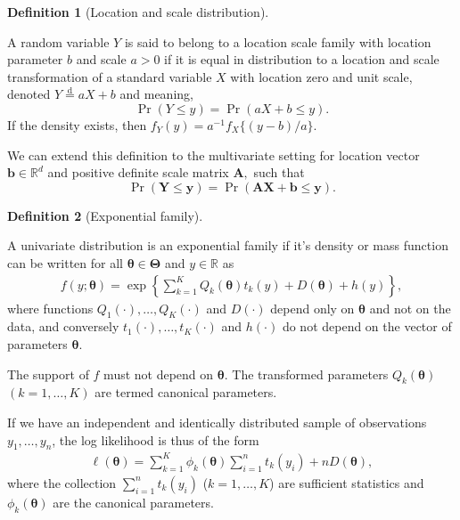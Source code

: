 \documentclass[
  11pt,
  letterpaper,
]{scrbook}
\theoremstyle{definition}
\newtheorem{definition}{Definition}[chapter]
\theoremstyle{plain}
\theoremstyle{plain}
\theoremstyle{definition}
\theoremstyle{definition}
\theoremstyle{remark}
\begin{document}
\begin{definition}[Location and scale
distribution]\protect\hypertarget{def-location-scale}{}\label{def-location-scale}

A random variable \(Y\) is said to belong to a location scale family
with location parameter \(b\) and scale \(a>0\) if it is equal in
distribution to a location and scale transformation of a standard
variable \(X\) with location zero and unit scale, denoted
\(Y \stackrel{\mathrm{d}}{=} aX + b\) and meaning,
\[\Pr(Y \leq y) = \Pr(aX + b \leq y).\] If the density exists, then
\(f_Y(y) = a^{-1}f_X\{(y-b)/a\}.\)

We can extend this definition to the multivariate setting for location
vector \(\boldsymbol{b} \in \mathbb{R}^d\) and positive definite scale
matrix \(\mathbf{A},\) such that
\[\Pr(\boldsymbol{Y} \leq \boldsymbol{y}) = \Pr(\mathbf{A}\boldsymbol{X} + \boldsymbol{b} \leq \boldsymbol{y}).\]

\end{definition}

\begin{definition}[Exponential
family]\protect\hypertarget{def-exponential-family}{}\label{def-exponential-family}

A univariate distribution is an exponential family if it's density or
mass function can be written for all
\(\boldsymbol{\theta} \in \boldsymbol{\Theta}\) and \(y \in \mathbb{R}\)
as \begin{align*}
f(y; \boldsymbol{\theta}) = \exp\left\{ \sum_{k=1}^K Q_k(\boldsymbol{\theta}) t_k(y) + D(\boldsymbol{\theta}) + h(y)\right\}, 
\end{align*} where functions \(Q_1(\cdot), \ldots, Q_K(\cdot)\) and
\(D(\cdot)\) depend only on \(\boldsymbol{\theta}\) and not on the data,
and conversely \(t_1(\cdot), \ldots, t_K(\cdot)\) and \(h(\cdot)\) do
not depend on the vector of parameters \(\boldsymbol{\theta}.\)

The support of \(f\) must not depend on \(\boldsymbol{\theta}.\) The
transformed parameters \(Q_k(\boldsymbol{\theta})\) \((k=1, \ldots, K)\)
are termed canonical parameters.

\end{definition}

If we have an independent and identically distributed sample of
observations \(y_1, \ldots, y_n\), the log likelihood is thus of the
form \begin{align*}
\ell(\boldsymbol{\theta}) = \sum_{k=1}^K \phi_k(\boldsymbol{\theta}) \sum_{i=1}^n t_k(y_i) + n D(\boldsymbol{\theta}),
\end{align*} where the collection \(\sum_{i=1}^n t_k(y_i)\)
(\(k=1, \ldots, K\)) are sufficient statistics and
\(\phi_k(\boldsymbol{\theta})\) are the canonical parameters.
\end{document}
